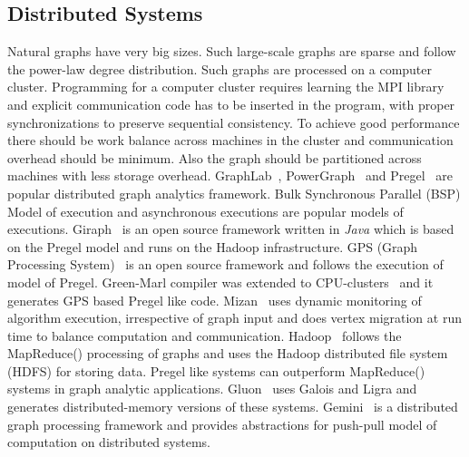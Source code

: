 \subsection{Distributed Systems}
Natural graphs have very big sizes. Such large-scale graphs are sparse and follow the power-law degree distribution. Such graphs are
 processed on a computer cluster.  Programming for a computer cluster requires learning the MPI library and explicit communication code
has to be inserted in the program, with proper synchronizations to preserve sequential consistency. To achieve good performance
there should be work balance across machines in the cluster and communication overhead should be minimum. Also the graph  should be
partitioned across machines with less storage overhead.
GraphLab~\cite{Low:2012:DGF:2212351.2212354}, PowerGraph~\cite{Gonzalez:2012:PDG:2387880.2387883} and Pregel~\cite{Malewicz:2010:PSL:1807167.1807184}  are popular distributed graph analytics framework.
 Bulk Synchronous Parallel (BSP) Model  \cite{Valiant:1990:BMP:79173.79181} of execution and asynchronous executions are popular models of executions.
Giraph~\cite{Ching:2015:OTE:2824032.2824077} is an  open source framework written in {\it Java} which is  based  on the Pregel model and runs on the  Hadoop infrastructure.
 GPS (Graph Processing System)~\cite{Salihoglu:2013:GGP:2484838.2484843} is an open source
framework and follows the execution of model of Pregel. 
Green-Marl compiler was extended to CPU-clusters~\cite{Hong:2014:SSG:2581122.2544162}  and
it generates GPS based Pregel like code.
 Mizan~\cite{Khayyat:2013:MSD:2465351.2465369}  uses
dynamic monitoring of algorithm execution, irrespective of graph
input and does vertex migration at run time to balance computation and communication.
Hadoop~\cite{White:2009:HDG:1717298}  follows the MapReduce() processing
of graphs and uses the  Hadoop distributed file system (HDFS)
for storing data.
 Pregel like systems can outperform MapReduce() systems in graph analytic applications.
Gluon~\cite{Dathathri:2018:GCS:3192366.3192404} uses Galois and Ligra and generates distributed-memory versions of these systems.
 Gemini~\cite{Zhu:2016:GCD:3026877.3026901} is a distributed graph processing framework and provides abstractions for push-pull model of computation on distributed systems.
